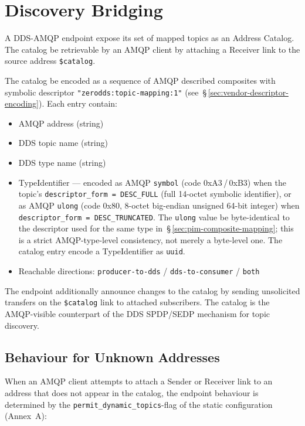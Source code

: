 \documentclass{../styles/zerodds-vendor-spec}
\begin{document}
\section{Discovery Bridging}\label{sec:pim-discovery-bridging}

A DDS-AMQP endpoint  expose its set of mapped topics as
an Address Catalog. The catalog  be retrievable by an
AMQP client by attaching a Receiver link to the source address
\texttt{\$catalog}.

The catalog  be encoded as a sequence of AMQP
described composites with symbolic descriptor
\texttt{"zerodds:topic-mapping:1"}
(see~\S\,\ref{sec:vendor-descriptor-encoding}). Each entry
 contain:

\begin{itemize}
  \item AMQP address (string)
  \item DDS topic name (string)
  \item DDS type name (string)
  \item TypeIdentifier — encoded as AMQP \texttt{symbol} (code \textsf{0xA3}\,/\,\textsf{0xB3}) when the topic's \texttt{descriptor\_form = DESC\_FULL} (full 14-octet symbolic identifier), or as AMQP \texttt{ulong} (code \textsf{0x80}, 8-octet big-endian unsigned 64-bit integer) when \texttt{descriptor\_form = DESC\_TRUNCATED}. The \texttt{ulong} value  be byte-identical to the descriptor used for the same type in~\S\,\ref{sec:pim-composite-mapping}; this is a strict AMQP-type-level consistency, not merely a byte-level one. The catalog entry  encode a TypeIdentifier as \texttt{uuid}.
  \item Reachable directions: \texttt{producer-to-dds} /
        \texttt{dds-to-consumer} / \texttt{both}
\end{itemize}

The endpoint  additionally announce changes to the
catalog by sending unsolicited transfers on the \texttt{\$catalog}
link to attached subscribers. The catalog is the AMQP-visible
counterpart of the DDS SPDP/SEDP mechanism for topic discovery.

\subsection{Behaviour for Unknown Addresses}\label{sec:pim-unknown-address}

When an AMQP client attempts to attach a Sender or Receiver link
to an address that does not appear in the catalog, the endpoint
behaviour is determined by the
\texttt{permit\_dynamic\_topics}-flag of the static configuration
(Annex~A):
\end{document}
